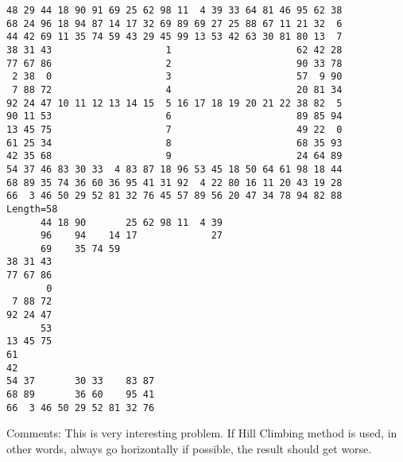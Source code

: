\documentclass[11pt]{article}
\begin{document}
\newpage
\begin{verbatim}
48 29 44 18 90 91 69 25 62 98 11  4 39 33 64 81 46 95 62 38 
68 24 96 18 94 87 14 17 32 69 89 69 27 25 88 67 11 21 32  6 
44 42 69 11 35 74 59 43 29 45 99 13 53 42 63 30 81 80 13  7 
38 31 43                    1                      62 42 28 
77 67 86                    2                      90 33 78 
 2 38  0                    3                      57  9 90 
 7 88 72                    4                      20 81 34 
92 24 47 10 11 12 13 14 15  5 16 17 18 19 20 21 22 38 82  5 
90 11 53                    6                      89 85 94 
13 45 75                    7                      49 22  0 
61 25 34                    8                      68 35 93 
42 35 68                    9                      24 64 89 
54 37 46 83 30 33  4 83 87 18 96 53 45 18 50 64 61 98 18 44 
68 89 35 74 36 60 36 95 41 31 92  4 22 80 16 11 20 43 19 28 
66  3 46 50 29 52 81 32 76 45 57 89 56 20 47 34 78 94 82 88 
Length=58
      44 18 90       25 62 98 11  4 39                      
      96    94    14 17             27                      
      69    35 74 59                                        
38 31 43                                                    
77 67 86                                                    
       0                                                    
 7 88 72                                                    
92 24 47                                                    
      53                                                    
13 45 75                                                    
61                                                          
42                                                          
54 37       30 33    83 87                                  
68 89       36 60    95 41                                  
66  3 46 50 29 52 81 32 76
\end{verbatim}
\indent Comments: This is very interesting problem. If Hill Climbing method is used, in other words, always go horizontally if possible, the result should get worse. 
\newpage
\end{document}
